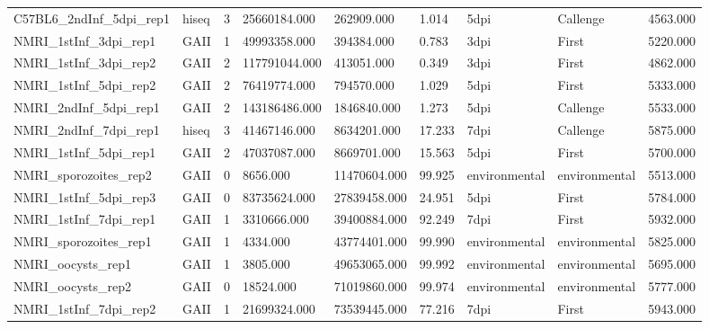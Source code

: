 \begin{table}[ht]
\begin{tabular}{lllllllll}
  C57BL6\_2ndInf\_5dpi\_rep1 & hiseq & 3 & 25660184.000 & 262909.000 & 1.014 & 5dpi & Callenge & 4563.000 \\ 
  NMRI\_1stInf\_3dpi\_rep1 & GAII & 1 & 49993358.000 & 394384.000 & 0.783 & 3dpi & First & 5220.000 \\ 
  NMRI\_1stInf\_3dpi\_rep2 & GAII & 2 & 117791044.000 & 413051.000 & 0.349 & 3dpi & First & 4862.000 \\ 
  NMRI\_1stInf\_5dpi\_rep2 & GAII & 2 & 76419774.000 & 794570.000 & 1.029 & 5dpi & First & 5333.000 \\ 
  NMRI\_2ndInf\_5dpi\_rep1 & GAII & 2 & 143186486.000 & 1846840.000 & 1.273 & 5dpi & Callenge & 5533.000 \\ 
  NMRI\_2ndInf\_7dpi\_rep1 & hiseq & 3 & 41467146.000 & 8634201.000 & 17.233 & 7dpi & Callenge & 5875.000 \\ 
  NMRI\_1stInf\_5dpi\_rep1 & GAII & 2 & 47037087.000 & 8669701.000 & 15.563 & 5dpi & First & 5700.000 \\ 
  NMRI\_sporozoites\_rep2 & GAII & 0 & 8656.000 & 11470604.000 & 99.925 & environmental & environmental & 5513.000 \\ 
  NMRI\_1stInf\_5dpi\_rep3 & GAII & 0 & 83735624.000 & 27839458.000 & 24.951 & 5dpi & First & 5784.000 \\ 
  NMRI\_1stInf\_7dpi\_rep1 & GAII & 1 & 3310666.000 & 39400884.000 & 92.249 & 7dpi & First & 5932.000 \\ 
  NMRI\_sporozoites\_rep1 & GAII & 1 & 4334.000 & 43774401.000 & 99.990 & environmental & environmental & 5825.000 \\ 
  NMRI\_oocysts\_rep1 & GAII & 1 & 3805.000 & 49653065.000 & 99.992 & environmental & environmental & 5695.000 \\ 
  NMRI\_oocysts\_rep2 & GAII & 0 & 18524.000 & 71019860.000 & 99.974 & environmental & environmental & 5777.000 \\ 
  NMRI\_1stInf\_7dpi\_rep2 & GAII & 1 & 21699324.000 & 73539445.000 & 77.216 & 7dpi & First & 5943.000 \\ 
   \hline
\end{tabular}
\end{table}
